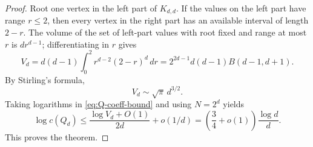 \documentclass[10pt,a4paper]{amsart}
\begin{document}
\begin{proof}
\bigskip
\noindent
Root one vertex in the left part of $K_{d,d}$.  If the values on the left part have range $r\le2$, then every vertex in the right part has an available interval of length $2-r$.  The volume of the set of left-part values with root fixed and range at most $r$ is $d r^{d-1}$; differentiating in $r$ gives
\begin{equation}\label{eq:Kdd-volume}
  V_d=d(d-1)\int_0^2 r^{d-2}(2-r)^d\,dr
  =2^{2d-1}d(d-1)B(d-1,d+1).
\end{equation}
By Stirling's formula,
\[
  V_d\sim \sqrt{\pi}\,d^{3/2}.
\]
Taking logarithms in \eqref{eq:Q-coeff-bound} and using $N=2^d$ yields
\[
  \log c(Q_d)
  \le \frac{\log V_d+O(1)}{2d}+o(1/d)
  =\left(\frac34+o(1)\right)\frac{\log d}{d}.
\]
This proves the theorem.
\end{proof}
\end{document}
